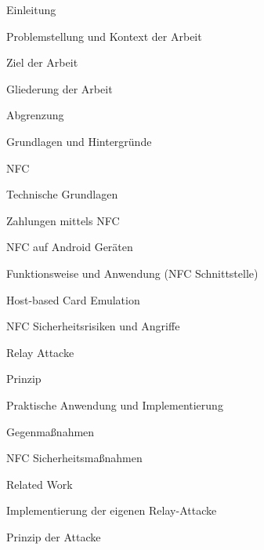 \documentclass[a4paper,10pt,ngerman]{INSOexpose}
\begin{document}
\begin{samepage}
  \begin{contentstructure}
    \item Einleitung	
	    \begin{contentstructure}
    	\item Problemstellung und Kontext der Arbeit
    	\item Ziel der Arbeit
    	\item Gliederung der Arbeit
    	\item Abgrenzung
	    \end{contentstructure}
    
    \item Grundlagen und Hintergründe 
	    \begin{contentstructure}
	    \item NFC
		    \begin{contentstructure}
	    	\item Technische Grundlagen
	    	\item Zahlungen mittels NFC
		   	\end{contentstructure}
	    \item NFC auf Android Geräten
		    \begin{contentstructure}
	    	\item Funktionsweise und Anwendung (NFC Schnittstelle)
	    	\item Host-based Card Emulation
		    \end{contentstructure}
	    \item NFC Sicherheitsrisiken und Angriffe
	    \item Relay Attacke
		    \begin{contentstructure}
	    	\item Prinzip
	    	\item Praktische Anwendung und Implementierung
	    	\item Gegenmaßnahmen
		    \end{contentstructure}
	    \item NFC Sicherheitsmaßnahmen
	    \end{contentstructure}
	\item Related Work \estimatedpages{2 Seiten}
    \item Implementierung der eigenen Relay-Attacke 
	    \begin{contentstructure}
	    \item Prinzip der Attacke

\end{contentstructure}
\end{contentstructure}
\end{samepage}
\end{document}
